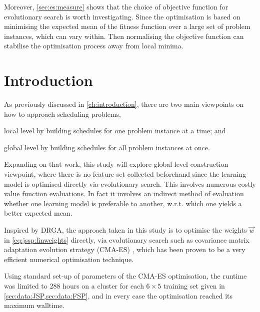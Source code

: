 Moreover, \cref{sec:es:measure} shows that the choice of objective function  for evolutionary search is worth investigating. Since the optimisation is based on minimising the expected mean of the fitness function over a large set of problem instances, which can vary within. Then normalising the objective function can stabilise the optimisation process away from local minima. 

\section{Introduction}
As previously discussed in \cref{ch:introduction}, there are two main viewpoints on how to approach scheduling problems,
\begin{inparaenum} 
\item local level by building schedules for one problem instance at a time;
and \item global level by building schedules for all problem instances at once.
\end{inparaenum}
 Expanding on that  work, this study will explore global level construction viewpoint, where there is no feature set collected beforehand since the learning model is optimised directly via evolutionary search. This involves numerous costly value function evaluations. In fact it involves an indirect method of evaluation whether one learning model is preferable to another, w.r.t. which one yields a better expected mean. 



Inspired by DRGA, the approach taken in this study is to optimise the weights $\vec{w}$ in \cref{eq:jssp:linweights} directly, via evolutionary search such as covariance matrix adaptation evolution strategy (CMA-ES) \cite{Hansen01}, which has been proven to be a very efficient numerical optimisation technique. 

Using standard set-up of parameters of the CMA-ES optimisation, the runtime was limited to 288 hours on a cluster for each $6\times5$ training set given in \cref{sec:data:JSP,sec:data:FSP}, and in every case the optimisation reached its maximum walltime.

